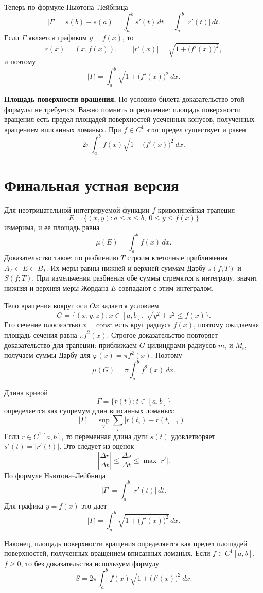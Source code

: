 \documentclass[12pt,a4paper]{article}
\newcommand{\dd}{\,d}
\begin{document}
Теперь по формуле Ньютона--Лейбница
\[
  |\Gamma|=s(b)-s(a)=\int_a^b s'(t)\dd t
  =
  \int_a^b |r'(t)|\dd t.
\]
Если \(\Gamma\) является графиком \(y=f(x)\), то
\[
  r(x)=(x,f(x)),\qquad |r'(x)|=\sqrt{1+\bigl(f'(x)\bigr)^2},
\]
и поэтому
\[
  |\Gamma|=\int_a^b \sqrt{1+\bigl(f'(x)\bigr)^2}\dd x.
\]

\textbf{Площадь поверхности вращения.}
По условию билета доказательство этой формулы не требуется. Важно помнить
определение: площадь поверхности вращения есть предел площадей поверхностей
усеченных конусов, полученных вращением вписанных ломаных. При \(f\in C^1\)
этот предел существует и равен
\[
  2\pi\int_a^b f(x)\sqrt{1+\bigl(f'(x)\bigr)^2}\dd x.
\]

\section*{Финальная устная версия}

Для неотрицательной интегрируемой функции \(f\) криволинейная трапеция
\[
  E=\{(x,y):a\le x\le b,\ 0\le y\le f(x)\}
\]
измерима, и ее площадь равна
\[
  \mu(E)=\int_a^b f(x)\dd x.
\]
Доказательство такое: по разбиению \(T\) строим клеточные приближения
\(A_T\subset E\subset B_T\). Их меры равны нижней и верхней суммам Дарбу
\(s(f;T)\) и \(S(f;T)\). При измельчении разбиения обе суммы стремятся к
интегралу, значит нижняя и верхняя меры Жордана \(E\) совпадают с этим
интегралом.

Тело вращения вокруг оси \(Ox\) задается условием
\[
  G=\{(x,y,z):x\in[a,b],\ \sqrt{y^2+z^2}\le f(x)\}.
\]
Его сечение плоскостью \(x=\mathrm{const}\) есть круг радиуса \(f(x)\), поэтому
ожидаемая площадь сечения равна \(\pi f^2(x)\). Строгое доказательство
повторяет доказательство для трапеции: приближаем \(G\) цилиндрами радиусов
\(m_i\) и \(M_i\), получаем суммы Дарбу для \(\varphi(x)=\pi f^2(x)\). Поэтому
\[
  \mu(G)=\pi\int_a^b f^2(x)\dd x.
\]

Длина кривой
\[
  \Gamma=\{r(t):t\in[a,b]\}
\]
определяется как супремум длин вписанных ломаных:
\[
  |\Gamma|=\sup_T\sum_i |r(t_i)-r(t_{i-1})|.
\]
Если \(r\in C^1[a,b]\), то переменная длина дуги \(s(t)\) удовлетворяет
\(s'(t)=|r'(t)|\). Это следует из оценок
\[
  \left|\frac{\Delta r}{\Delta t}\right|
  \le
  \frac{\Delta s}{\Delta t}
  \le
  \max |r'|.
\]
По формуле Ньютона--Лейбница
\[
  |\Gamma|=\int_a^b |r'(t)|\dd t.
\]
Для графика \(y=f(x)\) это дает
\[
  |\Gamma|=\int_a^b\sqrt{1+\bigl(f'(x)\bigr)^2}\dd x.
\]

Наконец, площадь поверхности вращения определяется как предел площадей
поверхностей, полученных вращением вписанных ломаных. Если
\(f\in C^1[a,b]\), \(f\ge0\), то без доказательства используем формулу
\[
  S=2\pi\int_a^b f(x)\sqrt{1+\bigl(f'(x)\bigr)^2}\dd x.
\]
\end{document}
